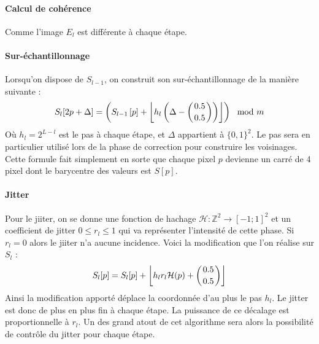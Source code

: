 \documentclass[12pt]{article}
\newcommand{\Z}{\mathbb{Z}}
\begin{document}
\paragraph{Calcul de cohérence}

Comme l'image $E_l$ est différente à chaque étape.

\paragraph{Sur-échantillonnage}
Lorsqu'on dispose de $S_{l-1}$, on construit son sur-échantillonnage de la manière suivante :
$$ S_l [2p + \Delta] = \left( S_{l-1} \left[ p \right] + \left\lfloor h_l \left( \Delta - \left( 0.5 \atop 0.5 \right) \right) \right\rfloor \right) \mod m $$
Où $h_l = 2^{L-l}$ est le pas à chaque étape, et $\Delta$ appartient à $\{ 0, 1 \}^2$. Le pas sera en particulier utilisé lors de la phase de correction pour construire les voisinages. Cette formule fait simplement en sorte que chaque pixel $p$ devienne un carré de 4 pixel dont le barycentre des valeurs est $S[p]$.

\paragraph{Jitter}
Pour le jiiter, on se donne une fonction de hachage $\mathcal{H} : \Z^2 \rightarrow [ -1; 1 ]^2$ et un coefficient de jitter $0 \leqslant r_l \leqslant 1$ qui va représenter l'intensité de cette phase. Si $r_l = 0$ alors le jiiter n'a aucune incidence. Voici la modification que l'on réalise sur $S_l$ :
$$ S_l[p] = S_l[p] + \left\lfloor h_l r_l \mathcal{H}(p) + \left( 0.5 \atop 0.5 \right) \right\rfloor $$
Ainsi la modification apporté déplace la coordonnée d'au plus le pas $h_l$. Le jitter est donc de plus en plus fin à chaque étape. La puissance de ce décalage est proportionnelle à $r_l$. Un des grand atout de cet algorithme sera alors la possibilité de contrôle du jitter pour chaque étape.
\end{document}
